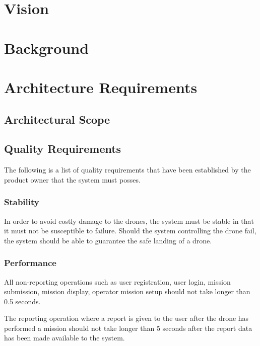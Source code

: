 \documentclass{article}
\begin{document}
	\section{Vision}%
	
	
	\section{Background} %

	\newpage
	
	\section{Architecture Requirements}%
		\subsection{Architectural Scope}%
		
			\setlength{\leftskip}{45px}
				\lipsum[2]

		\subsection{Quality Requirements}%
			The following is a list of quality requirements that have been established by the product owner that the system must posses.
			\subsubsection{Stability}
				\setlength{\leftskip}{61px}
			 	In order to avoid costly damage to the drones, the system must be stable in that it must not be susceptible to failure. Should the system controlling the drone fail, the system should be able to guarantee the safe landing of a drone.
				
			\subsubsection{Performance}
			All non-reporting operations such as user registration, user login, mission submission, mission display, operator mission setup should not take longer than 0.5 seconds.
			
			The reporting operation where a report is given to the user after the drone has performed a mission should not take longer than 5 seconds after the report data has been made available to the system.
			
\end{document}
